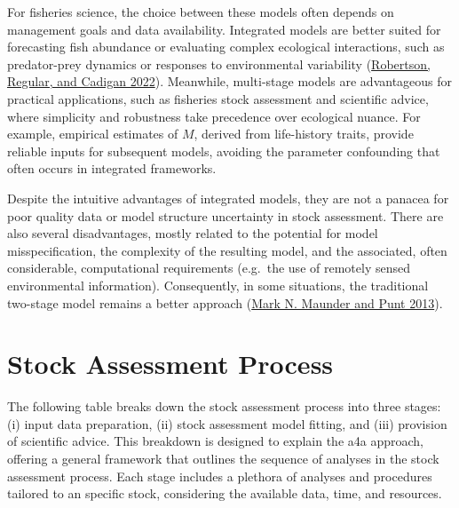 \documentclass[
]{book}
\begin{document}
For fisheries science, the choice between these models often depends on management goals and data availability. Integrated models are better suited for forecasting fish abundance or evaluating complex ecological interactions, such as predator-prey dynamics or responses to environmental variability (\protect\hyperlink{ref-Robertson_etal_2022}{Robertson, Regular, and Cadigan 2022}). Meanwhile, multi-stage models are advantageous for practical applications, such as fisheries stock assessment and scientific advice, where simplicity and robustness take precedence over ecological nuance. For example, empirical estimates of \(M\), derived from life-history traits, provide reliable inputs for subsequent models, avoiding the parameter confounding that often occurs in integrated frameworks.

Despite the intuitive advantages of integrated models, they are not a panacea for poor quality data or model structure uncertainty in stock assessment. There are also several disadvantages, mostly related to the potential for model misspecification, the complexity of the resulting model, and the associated, often considerable, computational requirements (e.g.~the use of remotely sensed environmental information). Consequently, in some situations, the traditional two-stage model remains a better approach (\protect\hyperlink{ref-maunderPunt2013}{Mark N. Maunder and Punt 2013}).

\hypertarget{stock-assessment-process}{%
\section{Stock Assessment Process}\label{stock-assessment-process}}

The following table breaks down the stock assessment process into three stages: (i) input data preparation, (ii) stock assessment model fitting, and (iii) provision of scientific advice. This breakdown is designed to explain the a4a approach, offering a general framework that outlines the sequence of analyses in the stock assessment process. Each stage includes a plethora of analyses and procedures tailored to an specific stock, considering the available data, time, and resources.
\end{document}
